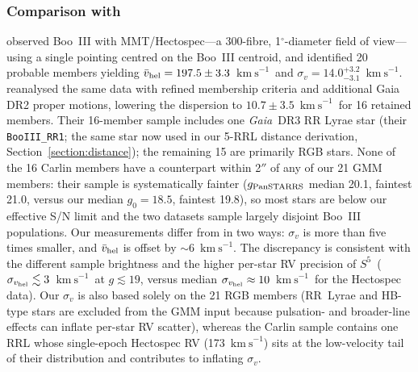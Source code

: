 \documentclass[twocolumn]{aastex631}
\newcommand{\SSSSS}{${S}^5$\xspace}
\newcommand{\gaia}{\textit{Gaia}\xspace}
\newcommand{\vlosUnits}{$\mathrm{km~s}^{-1}$\xspace}
\begin{document}
\subsubsection{Comparison with \citet{Carlin2009, Carlin2018}}
\citet{Carlin2009} observed Boo~III with MMT/Hectospec---a 300-fibre, 1$^\circ$-diameter field of view---using a single pointing centred on the Boo~III centroid, and identified 20 probable members yielding $\bar v_{\rm hel} = 197.5 \pm 3.3$~\vlosUnits\ and $\sigma_v = 14.0^{+3.2}_{-3.1}$~\vlosUnits.  \citet{Carlin2018} reanalysed the same data with refined membership criteria and additional Gaia DR2 proper motions, lowering the dispersion to $10.7 \pm 3.5$~\vlosUnits\ for 16 retained members.  Their 16-member sample includes one \gaia\ DR3 RR Lyrae star (their \texttt{BooIII\_RR1}; the same star now used in our 5-RRL distance derivation, Section~\ref{section:distance}); the remaining 15 are primarily RGB stars.  None of the 16 Carlin members have a counterpart within 2$''$ of any of our 21 GMM members: their sample is systematically fainter ($g_{\rm PanSTARRS}$ median 20.1, faintest 21.0, versus our median $g_0 = 18.5$, faintest 19.8), so most stars are below our effective S/N limit and the two datasets sample largely disjoint Boo~III populations.  Our measurements differ from \citet{Carlin2018} in two ways: $\sigma_v$ is more than five times smaller, and $\bar v_{\rm hel}$ is offset by $\sim 6$~\vlosUnits.  The discrepancy is consistent with the different sample brightness and the higher per-star RV precision of \SSSSS\ ($\sigma_{v_{\rm hel}} \lesssim 3$~\vlosUnits\ at $g \lesssim 19$, versus median $\sigma_{v_{\rm hel}} \approx 10$~\vlosUnits\ for the Hectospec data).  Our $\sigma_v$ is also based solely on the 21 RGB members (RR~Lyrae and HB-type stars are excluded from the GMM input because pulsation- and broader-line effects can inflate per-star RV scatter), whereas the Carlin sample contains one RRL whose single-epoch Hectospec RV (173~\vlosUnits) sits at the low-velocity tail of their distribution and contributes to inflating $\sigma_v$.
\end{document}
